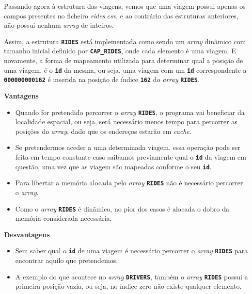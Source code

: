 \documentclass[12pt,a4paper]{report}
\begin{document}
Passando agora à estrutura das viagens, vemos que uma viagem possui apenas os campos presentes no ficheiro \textit{rides.csv}, e ao contrário das estruturas anteriores, não possui nenhum \textit{array} de inteiros.

Assim, a estrutura \textbf{\small\texttt{RIDES}} está implementada como sendo um \textit{array} dinâmico com tamanho inicial definido por \textbf{\small\texttt{CAP\_RIDES}}, onde cada elemento é uma viagem. E novamente, a forma de mapeamento utilizada para determinar qual a posição de uma viagem, é o \textbf{\small\texttt{id}} da mesma, ou seja, uma viagem com um \textbf{\small\texttt{id}} correspondente a \textbf{\small\texttt{000000000162}} é inserida na posição de índice \textbf{\small\texttt{162}} do \textit{array} \textbf{\small\texttt{RIDES}}.

\normalsize\textbf{Vantagens}
\begin{itemize}
   
    \item Quando for pretendido percorrer o \textit{array} \textbf{\small\texttt{RIDES}}, o programa vai beneficiar da localidade espacial, ou seja, será necessário menos tempo para percorrer as posições do \textit{array}, dado que os endereços estarão em \textit{cache}.
    
    \item Se pretendermos aceder a uma determinada viagem, essa operação pode ser feita em tempo constante caso saibamos previamente qual o \textbf{\small\texttt{id}} da viagem em questão, uma vez que as viagem são mapeadas conforme o seu \textbf{\small\texttt{id}}.

    \item Para libertar a memória alocada pelo \textit{array} \textbf{\small\texttt{RIDES}} não é necessário percorrer o \textit{array}.

    \item Como o \textit{array} \textbf{\small\texttt{RIDES}} é dinâmico, no pior dos casos é alocada o dobro da memória considerada necessária.
\end{itemize}

\pagebreak
\normalsize\textbf{Desvantagens}
\begin{itemize}
    \item Sem saber qual o \textbf{\small\texttt{id}} de uma viagem é necessário percorrer o \textit{array} \textbf{\small\texttt{RIDES}} para encontrar aquilo que pretendemos.
    
    \item A exemplo do que acontece no \textit{array} \textbf{\small\texttt{DRIVERS}}, também o \textit{array} \textbf{\small\texttt{RIDES}} possui a primeira posição vazia, ou seja, no índice zero não existe qualquer elemento.
\end{itemize}
\end{document}
